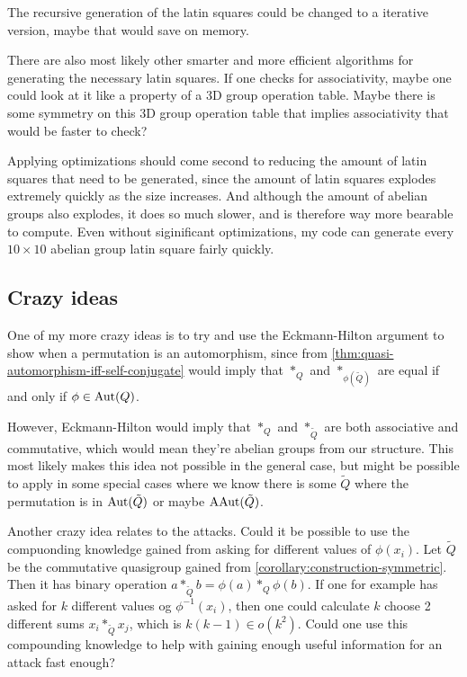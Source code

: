 \begin{idea}
    The recursive generation of the latin squares could be changed to a iterative version, maybe that would save on memory.

    There are also most likely other smarter and more efficient algorithms for generating the necessary latin squares. If one checks for associativity, maybe one could look at it like a property of a 3D group operation table. Maybe there is some symmetry on this 3D group operation table that implies associativity that would be faster to check?

    Applying optimizations should come second to reducing the amount of latin squares that need to be generated, since the amount of latin squares explodes extremely quickly as the size increases. And although the amount of abelian groups also explodes, it does so much slower, and is therefore way more bearable to compute. Even without siginificant optimizations, my code can generate every \( 10 \times 10 \) abelian group latin square fairly quickly.
\end{idea}

\subsection{Crazy ideas}

\begin{idea}
    One of my more crazy ideas is to try and use the Eckmann-Hilton argument to show when a permutation is an automorphism, since from \autoref{thm:quasi-automorphism-iff-self-conjugate} would imply that \( *_Q \) and \( *_{\phi(\tilde{Q})} \) are equal if and only if \( \phi \in \operatorname{Aut}(Q) \). 
    
    However, Eckmann-Hilton would imply that \( *_Q \) and \( *_{\tilde{Q}} \) are both associative and commutative, which would mean they're abelian groups from our structure. This most likely makes this idea not possible in the general case, but might be possible to apply in some special cases where we know there is some \( \tilde{Q} \) where the permutation is in \( \operatorname{Aut}(\tilde{Q}) \) or maybe \( \operatorname{AAut}(\tilde{Q}) \).
\end{idea}

\begin{idea}
    Another crazy idea relates to the attacks. Could it be possible to use the compuonding knowledge gained from asking for different values of \( \phi(x_i) \). Let \( \tilde{Q} \) be the commutative quasigroup gained from \autoref{corollary:construction-symmetric}. Then it has binary operation \( a *_{\tilde{Q}} b = \phi(a) *_Q \phi(b) \). If one for example has asked for \( k \) different values og \( \phi^{-1}(x_i) \), then one could calculate \( k \) choose 2 different sums \( x_i *_{\tilde{Q}} x_j \), which is \( k(k - 1) \in o(k^2) \). Could one use this compounding knowledge to help with gaining enough useful information for an attack fast enough?
\end{idea}


